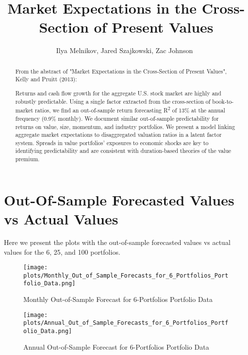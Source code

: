 \documentclass[12pt]{article}
\begin{document}
\title{
Market Expectations in the Cross-Section of Present Values
}

\author{
Ilya Melnikov, Jared Szajkowski, Zac Johnson\
}
\begin{titlepage}
\maketitle

\doublespacing
\begin{abstract}
    From the abstract of "Market Expectations in the Cross-Section of Present Values", Kelly and Pruitt (2013):

    Returns and cash flow growth for the aggregate U.S. stock market are highly and robustly predictable. Using 
    a single factor extracted from the cross-section of book-to-market ratios, we find an out-of-sample return 
    forecasting R\textsuperscript{2} of 13\% at the annual frequency (0.9\% monthly). We document similar out-of-sample 
    predictability for returns on value, size, momentum, and industry portfolios. We present a model linking 
    aggregate market expectations to disaggregated valuation ratios in a latent factor system. Spreads in value 
    portfolios’ exposures to economic shocks are key to identifying predictability and are consistent with 
    duration-based theories of the value premium.

\end{abstract}

\end{titlepage}

\doublespacing
\section{Out-Of-Sample Forecasted Values vs Actual Values}
Here we present the plots with the out-of-sample forecasted values vs actual values for the 6, 25, and 100 portfolios.
\begin{figure}[h]
    \centering
    \texttt{[image: plots/Monthly\_Out\_of\_Sample\_Forecasts\_for\_6\_Portfolios\_Portfolio\_Data.png]}
    \caption{Monthly Out-of-Sample Forecast for 6-Portfolios Portfolio Data}
    \label{fig:forecast_6_monthly}
\end{figure}

\begin{figure}[h]
    \centering
    \texttt{[image: plots/Annual\_Out\_of\_Sample\_Forecasts\_for\_6\_Portfolios\_Portfolio\_Data.png]}
    \caption{Annual Out-of-Sample Forecast for 6-Portfolios Portfolio Data}
    \label{fig:forecast_6_annual}
\end{figure}
\end{document}
